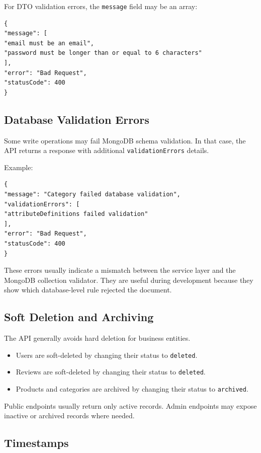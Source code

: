 For DTO validation errors, the \texttt{message} field may be an array:

\begin{verbatim}
{
"message": [
"email must be an email",
"password must be longer than or equal to 6 characters"
],
"error": "Bad Request",
"statusCode": 400
}
\end{verbatim}

\subsection{Database Validation Errors}

Some write operations may fail MongoDB schema validation. In that case, the API returns a response with additional \texttt{validationErrors} details.

Example:

\begin{verbatim}
{
"message": "Category failed database validation",
"validationErrors": [
"attributeDefinitions failed validation"
],
"error": "Bad Request",
"statusCode": 400
}
\end{verbatim}

These errors usually indicate a mismatch between the service layer and the MongoDB collection validator. They are useful during development because they show which database-level rule rejected the document.

\subsection{Soft Deletion and Archiving}

The API generally avoids hard deletion for business entities.

\begin{itemize}
    \item Users are soft-deleted by changing their status to \texttt{deleted}.
    \item Reviews are soft-deleted by changing their status to \texttt{deleted}.
    \item Products and categories are archived by changing their status to \texttt{archived}.
\end{itemize}

Public endpoints usually return only active records. Admin endpoints may expose inactive or archived records where needed.

\subsection{Timestamps}

